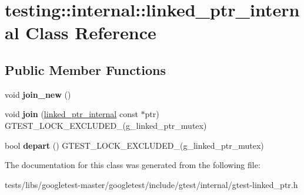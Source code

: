 \hypertarget{classtesting_1_1internal_1_1linked__ptr__internal}{}\section{testing\+:\+:internal\+:\+:linked\+\_\+ptr\+\_\+internal Class Reference}
\label{classtesting_1_1internal_1_1linked__ptr__internal}
\subsection*{Public Member Functions}
\begin{DoxyCompactItemize}
\item 
\mbox{\label{classtesting_1_1internal_1_1linked__ptr__internal_a742af1f65df2d5e2b7198a1b74264a83}} 
void {\bfseries join\+\_\+new} ()
\item 
\mbox{\label{classtesting_1_1internal_1_1linked__ptr__internal_acd5a341459f7e81b10b4112d8c764e2a}} 
void {\bfseries join} (\hyperlink{classtesting_1_1internal_1_1linked__ptr__internal}{linked\+\_\+ptr\+\_\+internal} const $\ast$ptr) G\+T\+E\+S\+T\+\_\+\+L\+O\+C\+K\+\_\+\+E\+X\+C\+L\+U\+D\+E\+D\+\_\+(g\+\_\+linked\+\_\+ptr\+\_\+mutex)
\item 
\mbox{\label{classtesting_1_1internal_1_1linked__ptr__internal_a8699e539d9702d363ef0351012d1b3ca}} 
bool {\bfseries depart} () G\+T\+E\+S\+T\+\_\+\+L\+O\+C\+K\+\_\+\+E\+X\+C\+L\+U\+D\+E\+D\+\_\+(g\+\_\+linked\+\_\+ptr\+\_\+mutex)
\end{DoxyCompactItemize}


The documentation for this class was generated from the following file\+:\begin{DoxyCompactItemize}
\item 
tests/libs/googletest-\/master/googletest/include/gtest/internal/gtest-\/linked\+\_\+ptr.\+h\end{DoxyCompactItemize}
